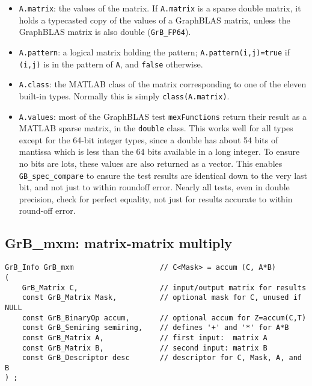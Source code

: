 \documentclass[12pt]{article}
\begin{document}
\begin{itemize}
\item \verb'A.matrix':  the values of the matrix.  If \verb'A.matrix' is a
    sparse double matrix, it holds a typecasted copy of the values of a
    GraphBLAS matrix, unless the GraphBLAS matrix is also double
    (\verb'GrB_FP64').

\item \verb'A.pattern': a logical matrix holding the pattern;
    \verb'A.pattern(i,j)=true' if \verb'(i,j)' is in the pattern of \verb'A',
    and \verb'false' otherwise.

\item \verb'A.class': the MATLAB class of the matrix corresponding to one of
    the eleven built-in types.  Normally this is simply \verb'class(A.matrix)'.

\item \verb'A.values': most of the GraphBLAS test \verb'mexFunctions' return
    their result as a MATLAB sparse matrix, in the \verb'double' class.  This
    works well for all types except for the 64-bit integer types, since a
    double has about 54 bits of mantissa which is less than the 64 bits
    available in a long integer.  To ensure no bits are lots, these values are
    also returned as a vector.  This enables \verb'GB_spec_compare' to ensure
    the test results are identical down to the very last bit, and not just to
    within roundoff error.  Nearly all tests, even in double precision, check
    for perfect equality, not just for results accurate to within round-off
    error.

\end{itemize}

\newpage
\subsection{{\sf GrB\_mxm:} matrix-matrix multiply} %
\label{mxm}

\begin{mdframed}[userdefinedwidth=6in]
{\footnotesize
\begin{verbatim}
GrB_Info GrB_mxm                    // C<Mask> = accum (C, A*B)
(
    GrB_Matrix C,                   // input/output matrix for results
    const GrB_Matrix Mask,          // optional mask for C, unused if NULL
    const GrB_BinaryOp accum,       // optional accum for Z=accum(C,T)
    const GrB_Semiring semiring,    // defines '+' and '*' for A*B
    const GrB_Matrix A,             // first input:  matrix A
    const GrB_Matrix B,             // second input: matrix B
    const GrB_Descriptor desc       // descriptor for C, Mask, A, and B
) ;
\end{verbatim} } \end{mdframed}
\end{document}
